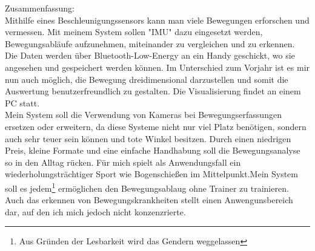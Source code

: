 Zusammenfassung:\\
\small
Mithilfe eines Beschleunigungssensors kann man viele Bewegungen erforschen und vermessen. 
Mit meinem System sollen "IMU" dazu eingesetzt werden, Bewegungsabläufe aufzunehmen, miteinander zu vergleichen 
und zu erkennen. \\
Die Daten werden über Bluetooth-Low-Energy an ein Handy geschickt, wo sie angesehen und gespeichert 
werden können. Im Unterschied zum Vorjahr ist es mir nun auch möglich, die Bewegung dreidimensional 
darzustellen und somit die Auswertung benutzerfreundlich zu gestalten. Die Visualisierung findet an 
einem PC statt.\\
Mein System soll die Verwendung von Kameras bei Bewegungserfassungen ersetzen oder erweitern, da diese Systeme 
nicht nur viel Platz benötigen, sondern auch sehr teuer sein können und tote Winkel besitzen. 
Durch einen niedrigen Preis, kleine Formate und eine einfache Handhabung soll die Bewegungsanalyse 
so in den Alltag rücken. Für mich spielt als Anwendungsfall ein wiederholungsträchtiger Sport wie 
Bogenschießen im Mittelpunkt.Mein System soll es jedem\footnote{Aus Gründen der Lesbarkeit wird das Gendern weggelassen} 
ermöglichen den Bewegungsablaug ohne Trainer zu trainieren.\\
Auch das erkennen von Bewegungskrankheiten stellt einen Anwengunsbereich dar, auf den ich mich jedoch nicht konzenzrierte.